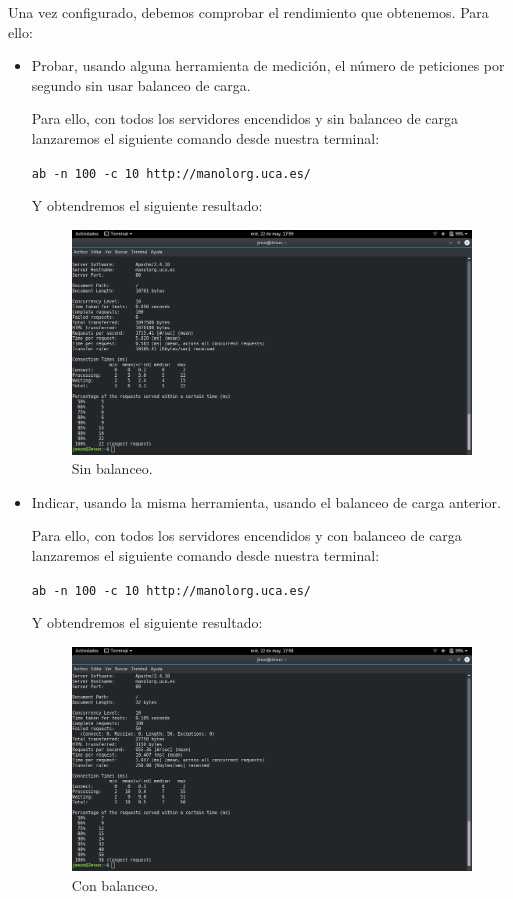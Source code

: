 \documentclass[12pt,letterpaper]{article}
\begin{document}
Una vez configurado, debemos comprobar el rendimiento que obtenemos. Para ello:
\begin{itemize}
	\item Probar, usando alguna herramienta de medición, el número de peticiones por segundo sin usar balanceo de carga.
	
	Para ello, con todos los servidores encendidos y sin balanceo de carga lanzaremos el siguiente comando desde nuestra terminal:
	\begin{center}
		\texttt{ab -n 100 -c 10 http://manolorg.uca.es/}
	\end{center}

	Y obtendremos el siguiente resultado:
	\begin{figure}[h]
		\centering
		\includegraphics[scale=0.34]{SinBalanceo.png}
		\caption{Sin balanceo.}
		\label{Sin balanceo}
	\end{figure}

	\item Indicar, usando la misma herramienta, usando el balanceo de carga anterior.
	
	Para ello, con todos los servidores encendidos y con balanceo de carga lanzaremos el siguiente comando desde nuestra terminal:
	\begin{center}
		\texttt{ab -n 100 -c 10 http://manolorg.uca.es/}
	\end{center}
	\newpage
	Y obtendremos el siguiente resultado:
	\begin{figure}[h]
		\centering
		\includegraphics[scale=0.34]{ConBalanceo.png}
		\caption{Con balanceo.}
		\label{Con balanceo}
	\end{figure}
\end{itemize}
\end{document}

